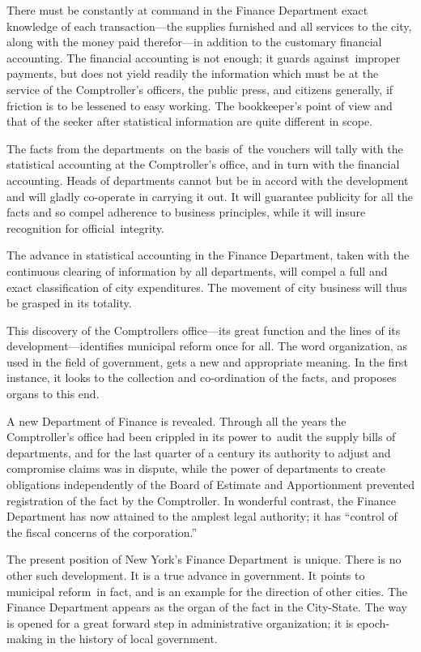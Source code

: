 \documentclass[twoside,symmetric,nobib,justified]{tufte-book}
\begin{document}
There must be constantly at command in the Finance Department exact
knowledge of each transaction---the supplies furnished and all services
to the city, along with the money paid therefor---in addition to the
customary financial accounting. The financial accounting is not enough;
it guards against~improper payments, but does not yield readily the
information which must be at the service of the Comptroller's officers,
the public press, and citizens generally, if friction is to be lessened
to easy working. The bookkeeper's point of view and that of the seeker
after statistical information are quite different in scope.~

The facts from the departments~on the basis of~the vouchers will tally
with the statistical accounting at the Comptroller's office, and in turn
with the financial accounting. Heads of departments cannot but be in
accord with the development and will gladly co-operate in carrying it
out. It will guarantee publicity for all the facts and so compel
adherence to business principles, while it will insure recognition for
official~integrity.~

The advance in statistical accounting in the Finance Department, taken
with the continuous clearing of information by all departments, will
compel a full and exact classification of city expenditures. The
movement of city business will thus be grasped in its totality.~

This discovery of the Comptroller\textquotesingle s office---its great
function and the lines of its development---identifies municipal reform
once for all. The word organization, as used in the field of government,
gets a new and appropriate meaning. In the first instance, it looks to
the collection and co-ordination of the facts, and proposes organs to
this end.~

A new Department of Finance is revealed. Through all the years the
Comptroller's office had been crippled in its power to~audit the supply
bills of departments, and for the last quarter of a century its
authority to adjust and compromise claims was in dispute, while the
power of departments to create obligations independently of the Board of
Estimate and Apportionment prevented registration of the fact by the
Comptroller. In wonderful contrast, the Finance Department has now
attained to the amplest legal authority; it has ``control of the fiscal
concerns of the corporation.''~

The present position of New York's Finance Department~is unique. There
is no other such development. It is a true advance in government. It
points to municipal reform~in fact, and is an example for the direction
of other cities. The Finance Department appears as the organ of the fact
in the City-State. The way is opened for a great forward step in
administrative organization; it is epoch-making in the history of local
government.~~
\end{document}
